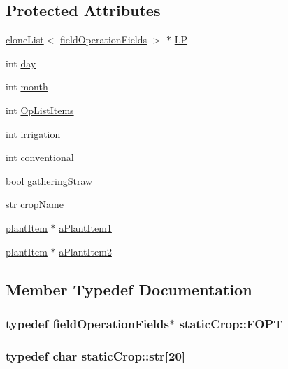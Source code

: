 \subsection*{Protected Attributes}
\begin{DoxyCompactItemize}
\item 
\hyperlink{classclone_list}{cloneList}$<$ \hyperlink{classfield_operation_fields}{fieldOperationFields} $>$ $\ast$ \hyperlink{classstatic_crop_a83abe813b3873bdca7b373a9c2061071}{LP}
\item 
int \hyperlink{classstatic_crop_a5f633c8fed33e9051eb776b9781c36ac}{day}
\item 
int \hyperlink{classstatic_crop_a2c8bc8fdbc9824534c54f9f74a17623e}{month}
\item 
int \hyperlink{classstatic_crop_af151e77db389d19489ee9d10f6a73628}{OpListItems}
\item 
int \hyperlink{classstatic_crop_a3da7e9ce6f6b3df3817e550994be66f1}{irrigation}
\item 
int \hyperlink{classstatic_crop_ae8459ed32ec510851565bdbe4ed8e286}{conventional}
\item 
bool \hyperlink{classstatic_crop_adcb2111f089cff49f8df033e5e77e425}{gatheringStraw}
\item 
\hyperlink{classstatic_crop_a78a95a86fbeacaf0b89d6a1e06e505f0}{str} \hyperlink{classstatic_crop_a75caaff99a291829f060f468a9f141d5}{cropName}
\item 
\hyperlink{classplant_item}{plantItem} $\ast$ \hyperlink{classstatic_crop_ae7226eaa52819aa9c2d663a6cd7b86d2}{aPlantItem1}
\item 
\hyperlink{classplant_item}{plantItem} $\ast$ \hyperlink{classstatic_crop_ac802684f900defee8a00dff8e907127e}{aPlantItem2}
\end{DoxyCompactItemize}


\subsection{Member Typedef Documentation}
\hypertarget{classstatic_crop_a6eb8fb6c3d2353627729635751b7ea27}{
\subsubsection[{FOPT}]{\setlength{\rightskip}{0pt plus 5cm}typedef {\bf fieldOperationFields}$\ast$ {\bf staticCrop::FOPT}}}
\label{classstatic_crop_a6eb8fb6c3d2353627729635751b7ea27}
\hypertarget{classstatic_crop_a78a95a86fbeacaf0b89d6a1e06e505f0}{
\subsubsection[{str}]{\setlength{\rightskip}{0pt plus 5cm}typedef char {\bf staticCrop::str}\mbox{[}20\mbox{]}}}
\label{classstatic_crop_a78a95a86fbeacaf0b89d6a1e06e505f0}


